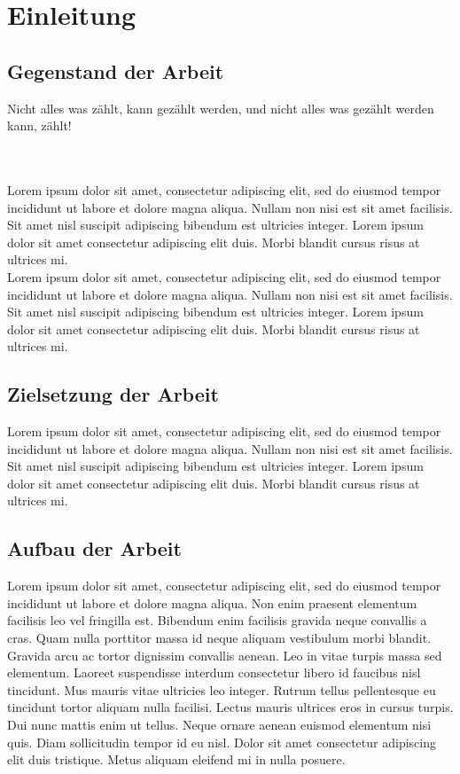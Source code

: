 \section{Einleitung}\label{einleitung}\thispagestyle{FooBar}
\subsection{Gegenstand der Arbeit}
\begin{itshape}\au Nicht alles was zählt, kann gezählt werden, und nicht alles was gezählt werden
kann, zählt!\ao\end{itshape}  
\\\\
Lorem ipsum dolor sit amet, consectetur adipiscing elit, sed do eiusmod tempor incididunt ut labore et dolore magna aliqua. Nullam non nisi est sit amet facilisis. Sit amet nisl suscipit adipiscing bibendum est ultricies integer. Lorem ipsum dolor sit amet consectetur adipiscing elit duis. Morbi blandit cursus risus at ultrices mi.
\\
Lorem ipsum dolor sit amet, consectetur adipiscing elit, sed do eiusmod tempor incididunt ut labore et dolore magna aliqua. Nullam non nisi est sit amet facilisis. Sit amet nisl suscipit adipiscing bibendum est ultricies integer. Lorem ipsum dolor sit amet consectetur adipiscing elit duis. Morbi blandit cursus risus at ultrices mi.
\subsection{Zielsetzung der Arbeit}
Lorem ipsum dolor sit amet, consectetur adipiscing elit, sed do eiusmod tempor incididunt ut labore et dolore magna aliqua. Nullam non nisi est sit amet facilisis. Sit amet nisl suscipit adipiscing bibendum est ultricies integer. Lorem ipsum dolor sit amet consectetur adipiscing elit duis. Morbi blandit cursus risus at ultrices mi.
\subsection{Aufbau der Arbeit}
Lorem ipsum dolor sit amet, consectetur adipiscing elit, sed do eiusmod tempor incididunt ut labore et dolore magna aliqua. Non enim praesent elementum facilisis leo vel fringilla est. Bibendum enim facilisis gravida neque convallis a cras. Quam nulla porttitor massa id neque aliquam vestibulum morbi blandit. Gravida arcu ac tortor dignissim convallis aenean. Leo in vitae turpis massa sed elementum. Laoreet suspendisse interdum consectetur libero id faucibus nisl tincidunt. Mus mauris vitae ultricies leo integer. Rutrum tellus pellentesque eu tincidunt tortor aliquam nulla facilisi. Lectus mauris ultrices eros in cursus turpis. Dui nunc mattis enim ut tellus. Neque ornare aenean euismod elementum nisi quis. Diam sollicitudin tempor id eu nisl. Dolor sit amet consectetur adipiscing elit duis tristique. Metus aliquam eleifend mi in nulla posuere.
